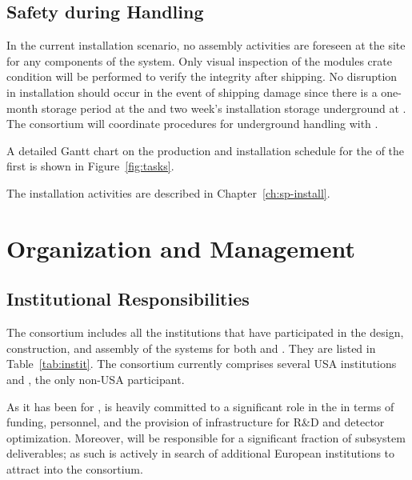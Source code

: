 \subsection{Safety during Handling} %
\label{sec:fdsp-hv-transport-safety}


In the current installation scenario, no assembly activities are foreseen at the  site for any components of the  system. Only visual inspection of the  modules crate condition will be performed to verify the integrity after shipping. 
No disruption in installation should occur in the event of shipping damage since there is a one-month storage period at the  and two week's installation storage underground at .  The  consortium will coordinate procedures for underground handling with .

A detailed Gantt chart on the production and installation schedule for the  of the first  is shown in Figure~\ref{fig:tasks}.

The installation activities are described in Chapter~\ref{ch:sp-install}.

\section{Organization and Management}
\label{sec:fdsp-hv-org}


\subsection{Institutional Responsibilities}
\label{sec:fdsp-hv-org-consortium}
The  consortium %
includes all the institutions that have participated in the design, construction, and assembly of the  systems for both   and . They are listed in 
Table~\ref{tab:instit}. 
The consortium  currently comprises several USA institutions and , %
the only non-USA participant. 
 
  
As it has been %
for ,  is heavily committed to a significant role in the   in terms of funding, personnel, 
 and the provision of infrastructure for R\&D and detector optimization. Moreover,  will be responsible for a significant fraction of subsystem deliverables; as such   is actively in search of additional European institutions to attract into the consortium. 
 
